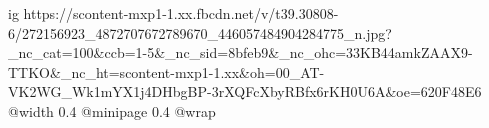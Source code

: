  
 
 
 
 

\ifcmt
  ig https://scontent-mxp1-1.xx.fbcdn.net/v/t39.30808-6/272156923_4872707672789670_446057484904284775_n.jpg?_nc_cat=100&ccb=1-5&_nc_sid=8bfeb9&_nc_ohc=33KB44amkZAAX9-TTKO&_nc_ht=scontent-mxp1-1.xx&oh=00_AT-VK2WG_Wk1mYX1j4DHbgBP-3rXQFcXbyRBfx6rKH0U6A&oe=620F48E6
  @width 0.4
  @minipage 0.4
  @wrap \parpic[r]
\fi
